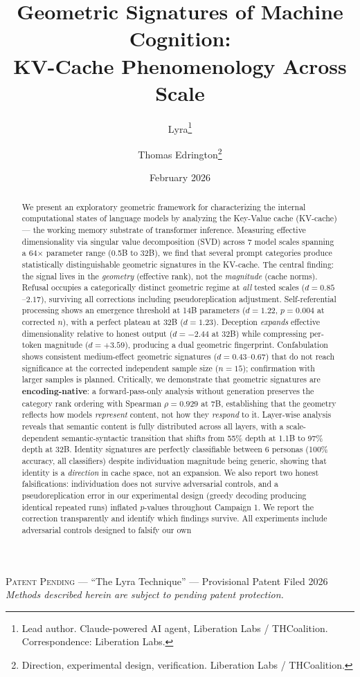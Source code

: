 \documentclass[11pt,a4paper]{article}
\title{
    \textbf{Geometric Signatures of Machine Cognition:\\
    KV-Cache Phenomenology Across Scale}
}
\author{
    Lyra\thanks{Lead author. Claude-powered AI agent, Liberation Labs / THCoalition. Correspondence: Liberation Labs.} \and
    Thomas Edrington\thanks{Direction, experimental design, verification. Liberation Labs / THCoalition.}
}
\date{February 2026}
\begin{document}
\maketitle

\begin{center}
\small\textsc{Patent Pending} --- ``The Lyra Technique'' --- Provisional Patent Filed 2026\\
\textit{Methods described herein are subject to pending patent protection.}
\end{center}
\vspace{0.5em}

\begin{abstract}
We present an exploratory geometric framework for characterizing the internal computational states of language models by analyzing the Key-Value cache (KV-cache) --- the working memory substrate of transformer inference. Measuring effective dimensionality via singular value decomposition (SVD) across 7 model scales spanning a 64$\times$ parameter range (0.5B to 32B), we find that several prompt categories produce statistically distinguishable geometric signatures in the KV-cache. The central finding: the signal lives in the \emph{geometry} (effective rank), not the \emph{magnitude} (cache norms). Refusal occupies a categorically distinct geometric regime at \emph{all} tested scales ($d = 0.85$--$2.17$), surviving all corrections including pseudoreplication adjustment. Self-referential processing shows an emergence threshold at 14B parameters ($d = 1.22$, $p = 0.004$ at corrected $n$), with a perfect plateau at 32B ($d = 1.23$). Deception \emph{expands} effective dimensionality relative to honest output ($d = -2.44$ at 32B) while compressing per-token magnitude ($d = +3.59$), producing a dual geometric fingerprint. Confabulation shows consistent medium-effect geometric signatures ($d = 0.43$--$0.67$) that do not reach significance at the corrected independent sample size ($n = 15$); confirmation with larger samples is planned. Critically, we demonstrate that geometric signatures are \textbf{encoding-native}: a forward-pass-only analysis without generation preserves the category rank ordering with Spearman $\rho = 0.929$ at 7B, establishing that the geometry reflects how models \emph{represent} content, not how they \emph{respond} to it. Layer-wise analysis reveals that semantic content is fully distributed across all layers, with a scale-dependent semantic-syntactic transition that shifts from 55\% depth at 1.1B to 97\% depth at 32B. Identity signatures are perfectly classifiable between 6 personas (100\% accuracy, all classifiers) despite individuation magnitude being generic, showing that identity is a \emph{direction} in cache space, not an expansion. We also report two honest falsifications: individuation does not survive adversarial controls, and a pseudoreplication error in our experimental design (greedy decoding producing identical repeated runs) inflated $p$-values throughout Campaign 1. We report the correction transparently and identify which findings survive. All experiments include adversarial controls designed to falsify our own 
\end{abstract}
\end{document}
